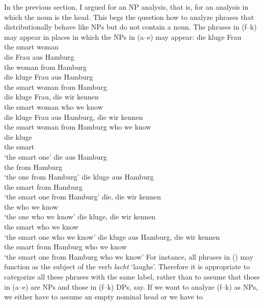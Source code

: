\documentclass[output=paper
  ,nobabel
  ,draftmode
  ,uniformtopskip %
  ,colorlinks, citecolor=brown
]{langscibook}
\begin{document}
\largerpage[2]
In the previous section, I argued for an NP analysis, that is, for an analysis in which the noun is the
head. This begs the question how to analyze phrases that distributionally behave like NPs but
do not contain a noun. The phrases in (f--k) may appear in places in which the NPs in
(a--e) may appear:
\eal
\ex 
\gll die kluge Frau\\
     the smart woman\\
\ex 
\gll die Frau aus Hamburg\\
     the woman from Hamburg\\
\ex 
\gll die kluge Frau aus Hamburg\\
     the smart woman from Hamburg\\
\ex 
\gll die kluge Frau, die wir kennen\\
     the smart woman who we know\\
\ex 
\gll die kluge Frau aus Hamburg, die wir kennen\\
     the smart woman from Hamburg who we know\\
\ex 
\gll die kluge\\
     the smart\\
\glt `the smart one'
\ex 
\label{ex-die-aus-hamburg} 
\gll die aus Hamburg\\
     the from Hamburg\\
\glt `the one from Hamburg'
\ex\label{ex-die-kluge-aus-hamburg} 
\gll die kluge aus Hamburg\\
     the smart from Hamburg\\
\glt `the smart one from Hamburg'
\ex 
\gll die, die wir kennen\\
     the who we know\\
\glt `the one who we know'
\ex 
\gll die kluge, die wir kennen\\
     the smart  who we know\\
\glt `the smart one who we know'
\ex 
\gll die kluge aus Hamburg, die wir kennen\\
     the smart from Hamburg who we know\\
\glt `the smart one from Hamburg who we know'
\zl
\largerpage
\noindent
For instance, all phrases in () may function as the subject of the verb \emph{lacht}
`laughs'. Therefore it is appropriate to categorize all these phrases with the same label, rather
than to assume that those in (a--e) are NPs and those in (f--k) DPs, say. If we want
to analyze (f--k) as NPs, we either have to assume an empty nominal head or we have to
\end{document}
